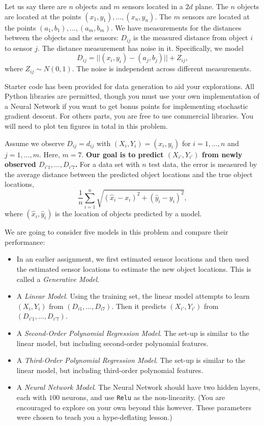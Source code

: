 
Let us say there are $n$ objects and $m$ sensors located in a $2d$ plane. The $n$ objects are located at the points $(x_1,y_1),\ldots,(x_n,y_n)$. The $m$ sensors are located at the points $(a_1,b_1),\ldots,(a_m,b_m)$.  We have measurements for the distances between the objects and the sensors: $D_{ij}$ is the measured distance from object $i$ to sensor $j$. The distance measurement has noise in it. Specifically, we model $$D_{ij} = ||(x_i, y_i)-(a_j,b_j)||+Z_{ij},$$ where $Z_{ij} \sim N(0, 1)$. The noise is independent across different measurements.

Starter code has been provided for data generation to aid your
explorations. All Python libraries are permitted, though you must use
your own implementation of a Neural Network if you want to get bonus
points for implementing stochastic gradient descent. For others parts,
you are free to use commercial libraries. You will need to plot ten figures in total in this problem.

Assume we observe $D_{ij}=d_{ij}$ with $(X_i,Y_i)=(x_i,y_i)$ for $i=1,\dots, n$ and $j=1,\dots,m$. Here, $m=7$. \textbf{Our goal is to predict $(X_{i'},Y_{i'})$ from newly observed $D_{{i'}1},\dots,D_{{i'}7}$.} For a data set with $n$ test data, the error is measured by the average distance between the predicted object locations and the true object locations, $$\frac{1}{n}\sum_{i=1}^n\sqrt{(\hat x_i-x_i)^2 + (\hat y_i - y_i)^2},$$ where $(\hat x_i, \hat y_i)$ is the location of objects predicted by a model.

We are going to consider five models in this problem and compare their performance:
	\begin{itemize}
		\item In an earlier assignment, we first estimated sensor locations and then used the estimated sensor locations to estimate the new object locations. This is called a \emph{Generative Model}.
		\item A \emph{Linear Model}. Using the training set, the linear model attempts to learn $(X_i, Y_i)$ from $(D_{i1}, \ldots, D_{i7})$. Then it predicts $(X_{i'},Y_{i'})$ from $(D_{i'1},\ldots,D_{i'7})$.
		\item A \emph{Second-Order Polynomial Regression Model}. The set-up is similar to the linear model, but including second-order polynomial features.
		\item A \emph{Third-Order Polynomial Regression Model}. The set-up is similar to the linear model, but including third-order polynomial features.
		\item A \emph{Neural Network Model}. The Neural
                  Network should have two hidden layers, each with
                  $100$ neurons, and use \texttt{Relu} as the
                  non-linearity. (You are encouraged to explore on
                  your own beyond this however. These parameters were
                  chosen to teach you a hype-deflating lesson.) 
	\end{itemize}

